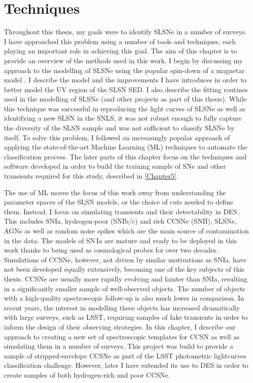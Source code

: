 \chapter{Techniques}
\label{Chapter4}

Throughout this thesis, my goals were to identify SLSNe in a number of surveys. I have approached this problem using a number of tools and techniques, each playing an important role in achieving this goal. The aim of this chapter is to provide an overview of the methods used in this work. I begin by discussing my approach to the modelling of SLSNe using the popular spin-down of a magnetar model . I describe the model and the improvements I have introduces in order to better model the UV region of the SLSN SED. I also describe the fitting routines used in the modelling of SLSNe (and other projects as part of this thesis). While this technique was successful in reproducing the light curves of SLSNe as well as identifying a new SLSN in the SNLS, it was not robust enough to fully capture the diversity of the SLSN sample and was not sufficient to classify SLSNe by itself. To solve this problem, I followed an increasingly popular approach of applying the state-of-the-art Machine Learning (ML) techniques to automate the classification process. The later parts of this chapter focus on the techniques and software developed in order to build the training sample of SNe and other transients required for this study, described in \cref{Chapter5}.

The use of ML moves the focus of this work away from understanding the parameter spaces of the SLSN models, or the choice of cuts needed to define them. Instead, I focus on simulating transients and their detectability in DES. This includes SNIa, hydrogen-poor (SNIb/c) and rich CCSNe (SNII), SLSNe, AGNs as well as random noise spikes which are the main source of contamination in the data. The models of SN\,Ia are mature and ready to be deployed in this work \citep{Kessler2009,Kessler2015} thanks to being used as cosmological probes for over two decades \citep{Riess1998,Perlmutter1999}. Simulations of CCSNe, however, not driven by similar motivations as SNIa, have not been developed equally extensively, becoming one of the key subjects of this thesis. CCSNe are usually more rapidly evolving and fainter than SNIa, resulting in a significantly smaller sample of well-observed objects. The number of objects with a high-quality spectroscopic follow-up is also much lower in comparison. In recent years, the interest in modelling these objects has increased dramatically with large surveys, such as LSST, requiring samples of fake transients in order to inform the design of their observing strategies. In this chapter, I describe our approach to creating a new set of spectroscopic templates for  CCSN as well as simulating them in a number of surveys. This project was build to provide a sample of stripped-envelope CCSNe as part of the LSST photometric lightcurves classification challenge. However, later I have extended its use to DES in order to create samples of both hydrogen-rich and poor CCSNe.

